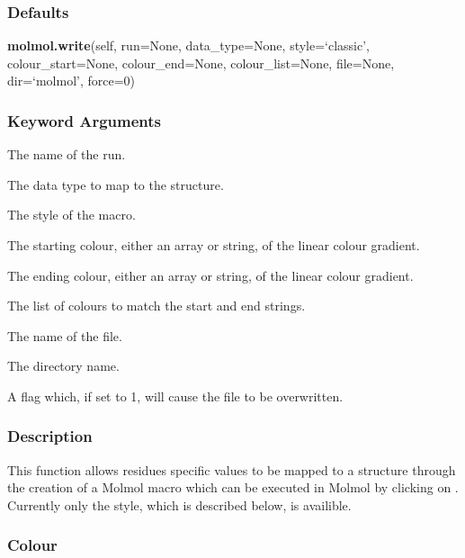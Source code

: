   
 \subsubsection{Defaults} 

 \textsf{\textbf{molmol.write}(self, run=None, data\_type=None, style=`classic', colour\_start=None, colour\_end=None, colour\_list=None, file=None, dir=`molmol', force=0)} 

  
 \subsubsection{Keyword Arguments} 

   The name of the run.   

   The data type to map to the structure.   

   The style of the macro.   

   The starting colour, either an array or string, of the linear colour gradient.   

   The ending colour, either an array or string, of the linear colour gradient.   

   The list of colours to match the start and end strings.   

   The name of the file.   

   The directory name.   

   A flag which, if set to 1, will cause the file to be overwritten.  

  

  
 \subsubsection{Description} 

 This function allows residues specific values to be mapped to a structure through the creation of a Molmol  macro which can be executed in Molmol by clicking on .  Currently only the  style, which is described below, is availible. 
  

  
 \subsubsection{Colour} 

